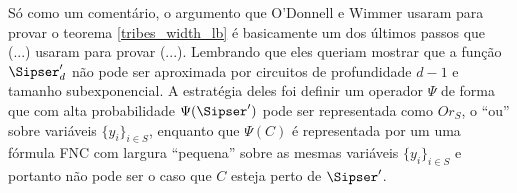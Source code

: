 Só como um comentário, o argumento que O'Donnell e Wimmer usaram para provar o teorema \ref{tribes_width_lb} é basicamente um dos últimos passos que (...) usaram para provar (...). Lembrando que eles queriam mostrar que a função $\Sipser^{\prime}_{d}$ não pode ser aproximada por circuitos de profundidade $d - 1$ e tamanho subexponencial. A estratégia deles foi definir um operador $\Psi$ de forma que com alta probabilidade $\Psi(\Sipser^{\prime})$ pode ser representada como $Or_{S}$, o ``ou'' sobre variáveis $\{y_{i}\}_{i \in S}$, enquanto que $\Psi(C)$ é representada por um uma fórmula FNC com largura ``pequena'' sobre as mesmas variáveis $\{y_{i}\}_{i \in S}$ e portanto não pode ser o caso que $C$ esteja perto de $\Sipser^{\prime}$.